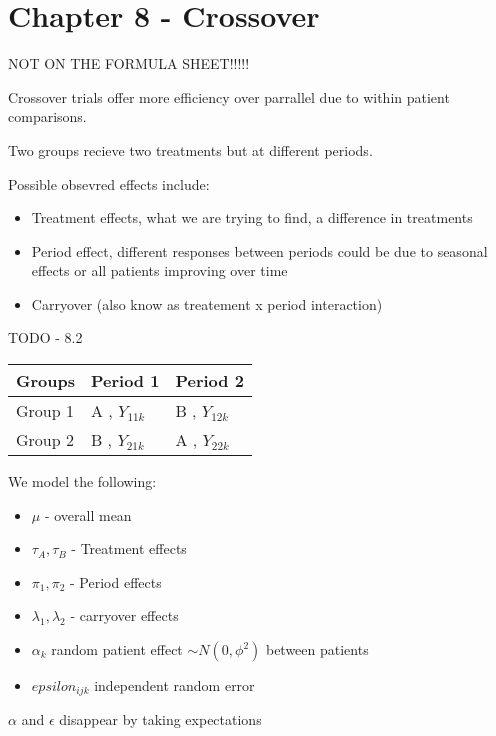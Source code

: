 \documentclass[
  letterpaper,
  DIV=11,
  numbers=noendperiod]{scrreprt}
\providecommand{\tightlist}{%
  \setlength{\itemsep}{0pt}\setlength{\parskip}{0pt}}\usepackage{longtable,booktabs,array}
\begin{document}
\hypertarget{chapter-8---crossover}{%
\section{Chapter 8 - Crossover}\label{chapter-8---crossover}}

NOT ON THE FORMULA SHEET!!!!!

Crossover trials offer more efficiency over parrallel due to within
patient comparisons.

Two groups recieve two treatments but at different periods.

Possible obsevred effects include:

\begin{itemize}
\tightlist
\item
  Treatment effects, what we are trying to find, a difference in
  treatments
\item
  Period effect, different responses between periods could be due to
  seasonal effects or all patients improving over time
\item
  Carryover (also know as treatement x period interaction)
\end{itemize}

TODO - 8.2

\begin{longtable}[]{@{}lll@{}}
\toprule()
Groups & Period 1 & Period 2 \\
\midrule()
\endhead
Group 1 & A , \(Y_{11k}\) & B , \(Y_{12k}\) \\
Group 2 & B , \(Y_{21k}\) & A , \(Y_{22k}\) \\
\bottomrule()
\end{longtable}

We model the following:

\begin{itemize}
\tightlist
\item
  \(\mu\) - overall mean
\item
  \(\tau_A , \tau_B\) - Treatment effects
\item
  \(\pi_1, \pi_2\) - Period effects
\item
  \(\lambda_1, \lambda_2\) - carryover effects
\item
  \(\alpha_k\) random patient effect \(\sim N(0, \phi^2)\) between
  patients
\item
  \(epsilon_{ijk}\) independent random error
\end{itemize}

\(\alpha\) and \(\epsilon\) disappear by taking expectations
\end{document}
